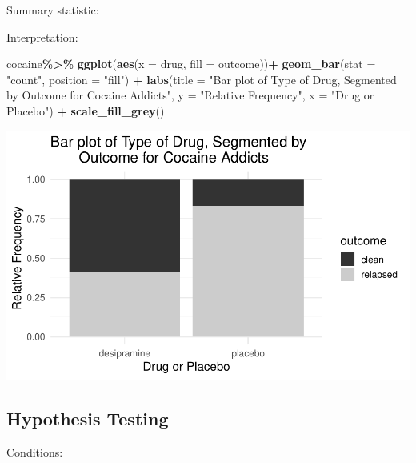 \documentclass[
]{report}
\newenvironment{Shaded}{\begin{snugshade}}{\end{snugshade}}
\newcommand{\AttributeTok}[1]{\textcolor[rgb]{0.13,0.29,0.53}{#1}}
\newcommand{\FunctionTok}[1]{\textcolor[rgb]{0.13,0.29,0.53}{\textbf{#1}}}
\newcommand{\NormalTok}[1]{#1}
\newcommand{\SpecialCharTok}[1]{\textcolor[rgb]{0.81,0.36,0.00}{\textbf{#1}}}
\newcommand{\StringTok}[1]{\textcolor[rgb]{0.31,0.60,0.02}{#1}}
\begin{document}
Summary statistic:

\vspace{0.4in}

Interpretation:

\vspace{0.5in}

\begin{Shaded}
\begin{Highlighting}[]
\NormalTok{cocaine}\SpecialCharTok{\%\textgreater{}\%}
  \FunctionTok{ggplot}\NormalTok{(}\FunctionTok{aes}\NormalTok{(}\AttributeTok{x =}\NormalTok{ drug, }\AttributeTok{fill =}\NormalTok{ outcome))}\SpecialCharTok{+}
  \FunctionTok{geom\_bar}\NormalTok{(}\AttributeTok{stat =} \StringTok{"count"}\NormalTok{, }\AttributeTok{position =} \StringTok{"fill"}\NormalTok{) }\SpecialCharTok{+}
  \FunctionTok{labs}\NormalTok{(}\AttributeTok{title =} \StringTok{"Bar plot of Type of Drug, Segmented by }
\StringTok{       Outcome for Cocaine Addicts"}\NormalTok{,}
       \AttributeTok{y =} \StringTok{"Relative Frequency"}\NormalTok{,}
       \AttributeTok{x =} \StringTok{"Drug or Placebo"}\NormalTok{) }\SpecialCharTok{+}
    \FunctionTok{scale\_fill\_grey}\NormalTok{()}
\end{Highlighting}
\end{Shaded}

\begin{center}\includegraphics[width=0.7\linewidth]{08-LN09-two-cat-simulation_files/figure-latex/unnamed-chunk-3-1} \end{center}

\newpage

\hypertarget{hypothesis-testing-2}{%
\subsection*{Hypothesis Testing}\label{hypothesis-testing-2}}

Conditions:
\end{document}
